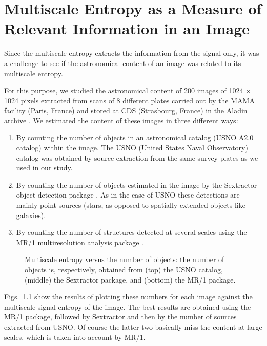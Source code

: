 \chapter{Multiscale Entropy as a Measure of Relevant Information in an Image}
 
Since the multiscale entropy extracts the information from the signal only, 
it was a  challenge to see if the  astronomical content of  an image
was related to its multiscale entropy.

For this purpose, we studied the astronomical content of 200 images 
of 1024 $\times$ 
1024 pixels extracted from scans of 8 different plates carried out  
by the MAMA facility (Paris, France) 
\cite{astro:guibert92} and stored at CDS (Strasbourg, France) 
in the Aladin
archive \cite{compress:bonnarel99}. We estimated the content of these images 
in three different ways:
\begin{enumerate}     
\item By counting the number of objects in an astronomical catalog
(USNO A2.0 catalog)   
within the image. The
 USNO (United States Naval Observatory) 
catalog was obtained by source extraction from the same survey 
 plates as we used in our study.
\item By counting the number of objects estimated in the image by the
 Sextractor object detection 
package \cite{astro:bertin96}. As in the case of USNO 
these detections are mainly point sources (stars, as opposed to 
spatially extended objects like galaxies).
\item  By counting the number of structures detected at several scales using 
 the MR/1 multiresolution analysis package \cite{starck:mr1_99}.
\end{enumerate}

\begin{figure}[htb]
\centerline{
\vbox{
}}
\caption{Multiscale entropy versus the number of objects: the number
of objects is, respectively, obtained from (top) the USNO catalog, (middle)
the Sextractor package, and (bottom) the MR/1 package.}
\label{fig_cds_entropy}
\end{figure}

Figs.~\ref{fig_cds_entropy} show the results of plotting these numbers 
for each image against the multiscale signal entropy of the image. 
The best results are obtained using the MR/1 package, 
 followed by Sextractor and then by the number of sources extracted
 from USNO. Of course the latter two basically miss the content
at large scales, which is taken into account by MR/1.

